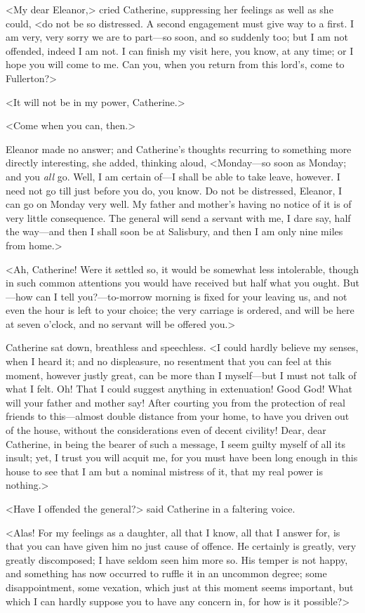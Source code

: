  <My dear Eleanor,> cried Catherine, suppressing her feelings as well as she could, <do not be so distressed. A second engagement must give way to a first. I am very, very sorry we are to part—so soon, and so suddenly too; but I am not offended, indeed I am not. I can finish my visit here, you know, at any time; or I hope you will come to me. Can you, when you return from this lord's, come to Fullerton?> 

 <It will not be in my power, Catherine.> 

 <Come when you can, then.> 

 Eleanor made no answer; and Catherine's thoughts recurring to something more directly interesting, she added, thinking aloud, <Monday—so soon as Monday; and you \textit{all} go. Well, I am certain of—I shall be able to take leave, however. I need not go till just before you do, you know. Do not be distressed, Eleanor, I can go on Monday very well. My father and mother's having no notice of it is of very little consequence. The general will send a servant with me, I dare say, half the way—and then I shall soon be at Salisbury, and then I am only nine miles from home.> 

 <Ah, Catherine! Were it settled so, it would be somewhat less intolerable, though in such common attentions you would have received but half what you ought. But—how can I tell you?—to-morrow morning is fixed for your leaving us, and not even the hour is left to your choice; the very carriage is ordered, and will be here at seven o'clock, and no servant will be offered you.> 

 Catherine sat down, breathless and speechless. <I could hardly believe my senses, when I heard it; and no displeasure, no resentment that you can feel at this moment, however justly great, can be more than I myself—but I must not talk of what I felt. Oh! That I could suggest anything in extenuation! Good God! What will your father and mother say! After courting you from the protection of real friends to this—almost double distance from your home, to have you driven out of the house, without the considerations even of decent civility! Dear, dear Catherine, in being the bearer of such a message, I seem guilty myself of all its insult; yet, I trust you will acquit me, for you must have been long enough in this house to see that I am but a nominal mistress of it, that my real power is nothing.> 

 <Have I offended the general?> said Catherine in a faltering voice. 

 <Alas! For my feelings as a daughter, all that I know, all that I answer for, is that you can have given him no just cause of offence. He certainly is greatly, very greatly discomposed; I have seldom seen him more so. His temper is not happy, and something has now occurred to ruffle it in an uncommon degree; some disappointment, some vexation, which just at this moment seems important, but which I can hardly suppose you to have any concern in, for how is it possible?> 

